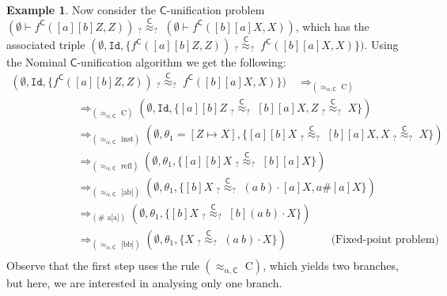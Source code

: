 \documentclass[submission,copyright,creativecommons]{eptcs}
\newcommand{\caleq}{\approx_{\alpha,\theory{C}}}
\newcommand{\theory}[1]{\ensuremath{\mathsf{#1}}}
\theoremstyle{plain}
\theoremstyle{definition}
\newtheorem{example}{Example}[section]
\theoremstyle{remark}
\begin{document}
\begin{example}
Now consider the \theory{C}-unification problem 
$(\emptyset\vdash f^\theory{C}([a][b]Z,Z)) \; _?{\overset{\theory{C}}{\approx}}_? \; (\emptyset\vdash  f^\theory{C}([b][a]X,X))$,
which has the associated triple $(\emptyset, \mathtt{Id}, \{f^\theory{C}([a][b]Z,Z)) \; _?{\overset{\theory{C}}{\approx}}_? \; f^\theory{C}([b][a]X,X)\})$. 
Using the Nominal \theory{C}-unification algorithm we get the following:
{\small
$$
\begin{array}{l}
    (\emptyset, \mathtt{Id}, \{f^\theory{C}([a][b]Z,Z)) \; _?{\overset{\theory{C}}{\approx}}_? \; f^\theory{C}([b][a]X,X)\}) \quad \Longrightarrow_{(\caleq \text{\ C})} \\ 
    \qquad \qquad  \qquad \Longrightarrow_{(\caleq \text{\ C})}  (\emptyset, \mathtt{Id}, \{[a][b]Z \; _?{\overset{\theory{C}}{\approx}}_? \; [b][a]X, Z \; _?{\overset{\theory{C}}{\approx}}_? \; X\}) \\
    \qquad \qquad \qquad \Longrightarrow_{(\caleq \text{\ inst})}  (\emptyset, \theta_1 = [Z\mapsto X], \{[a][b]X \; _?{\overset{\theory{C}}{\approx}}_? \; [b][a]X, X \; _?{\overset{\theory{C}}{\approx}}_? \; X\})  \\
    \qquad \qquad \qquad \Longrightarrow_{(\caleq \text{\ refl})}  (\emptyset, \theta_1, \{[a][b]X \; _?{\overset{\theory{C}}{\approx}}_? \; [b][a]X \}) \\
    \qquad \qquad \qquad \Longrightarrow_{(\caleq \text{\ [ab]})}  (\emptyset, \theta_1, \{[b]X \; _?{\overset{\theory{C}}{\approx}}_? \; (a\ b)\cdot[a]X, a\# [a]X \}) \\
    \qquad \qquad \qquad \Longrightarrow_{(\# \text{\ a[a]})}  (\emptyset, \theta_1, \{[b]X \; _?{\overset{\theory{C}}{\approx}}_? \; [b](a\ b)\cdot X \}) \\
    \qquad \qquad \qquad \Longrightarrow_{(\caleq \text{\ [bb]})}  (\emptyset, \theta_1, \{X \; _?{\overset{\theory{C}}{\approx}}_? \; (a\ b)\cdot X \}) \qquad\qquad \text{(Fixed-point problem)} \\
\end{array}
$$
}
Observe that the first step uses the rule $(\caleq \text{\ C})$, which yields two branches, but here, we are interested in analysing only one branch.


\end{example}
\end{document}
